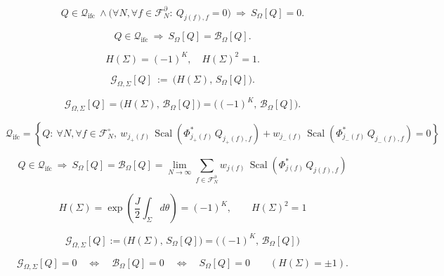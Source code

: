 \documentclass[12pt]{article}
\begin{document}
\begin{equation}
\boxed{
Q\in\mathcal{Q}_{\mathrm{ifc}}\ \wedge
\Big(\forall N,\forall f\in\mathcal{F}_N^\partial:\ Q_{j(f),f}=0\Big)
\ \Longrightarrow\
S_\Omega[Q]=0.
}
\end{equation}

\begin{equation}
Q\in\mathcal{Q}_{\mathrm{ifc}}\ \Longrightarrow\ S_\Omega[Q]=\mathcal{B}_\Omega[Q].
\end{equation}

\begin{equation}
H(\Sigma)=(-1)^K,\quad H(\Sigma)^2=1.
\end{equation}

\begin{equation}
\mathcal{G}_{\Omega,\Sigma}[Q]\ :=\ \bigl(H(\Sigma),\,S_\Omega[Q]\bigr).
\end{equation}

\begin{equation}
\mathcal{G}_{\Omega,\Sigma}[Q]
=\bigl(H(\Sigma),\,\mathcal{B}_\Omega[Q]\bigr)
=\bigl((-1)^K,\,\mathcal{B}_\Omega[Q]\bigr).
\end{equation}

\begin{equation}
\boxed{
\mathcal{Q}_{\mathrm{ifc}}
=
\left\{
Q:\ \forall N,\forall f\in\mathcal{F}_N^\circ,\ 
w_{j_+(f)}\,\operatorname{Scal}\!\left(\Phi_{j_+(f)}^*\,Q_{j_+(f),f}\right)
+
w_{j_-(f)}\,\operatorname{Scal}\!\left(\Phi_{j_-(f)}^*\,Q_{j_-(f),f}\right)
=0
\right\}
}
\end{equation}

\begin{equation}
\boxed{
Q\in\mathcal{Q}_{\mathrm{ifc}}\ \Longrightarrow\
S_\Omega[Q]=\mathcal{B}_\Omega[Q]
=\lim_{N\to\infty}\sum_{f\in\mathcal{F}_N^\partial}
w_{j(f)}\,\operatorname{Scal}\!\left(\Phi_{j(f)}^*\,Q_{j(f),f}\right)
}
\end{equation}

\begin{equation}
\boxed{
H(\Sigma)=\exp\!\left(\frac{J}{2}\int_\Sigma d\theta\right)=(-1)^K,\qquad H(\Sigma)^2=1
}
\end{equation}

\begin{equation}
\boxed{
\mathcal{G}_{\Omega,\Sigma}[Q]
:=\bigl(H(\Sigma),\,S_\Omega[Q]\bigr)
=\bigl((-1)^K,\,\mathcal{B}_\Omega[Q]\bigr)
}
\end{equation}

\begin{equation}
\boxed{
\mathcal{G}_{\Omega,\Sigma}[Q]=0
\quad\Longleftrightarrow\quad
\mathcal{B}_\Omega[Q]=0
\quad\Longleftrightarrow\quad
S_\Omega[Q]=0
\qquad (H(\Sigma)=\pm1).
}
\end{equation}
\end{document}
